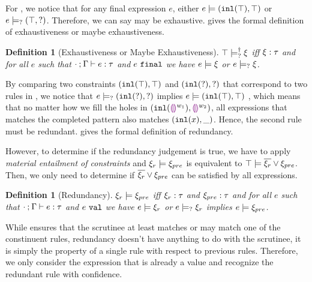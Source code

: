 \documentclass[acmsmall,screen,review,nonacm]{acmart}
\theoremstyle{slplain}
\numberwithin{thm}{section}
\newtheorem{defn}[thm]{Definition}
\begin{document}
For , we notice that for any final expression $e$, either 
$e \models (\mathtt{inl}(\top) , \top)$ or $e \models_{?} (\top , \mathtt{?})$.
Therefore, we can say  may be exhaustive.  gives the formal definition of exhaustiveness or maybe exhaustiveness.

\begin{defn}[Exhaustiveness or Maybe Exhaustiveness]
  \label{defn:exhaustiveness}
  $\top \models_{?}^{\dag} \xi$ iff $\xi : \tau$ and for all $e$ such that $\cdot \mathbin{;} \Gamma \vdash e : \tau$ and $e ~\mathtt{final}$ we have $e \models \xi$ or $e \models_{?} \xi$.
\end{defn}

By comparing two constraints $(\mathtt{inl}(\top) , \top)$ and $(\mathtt{inl}(\mathtt{?}) , \mathtt{?})$ that correspond to two rules in , we notice that
$e \models_{?} (\mathtt{inl}(\mathtt{?}) , \mathtt{?})$ implies $e \models (\mathtt{inl}(\top) , \top)$
, which means that no matter how we fill the holes in $(\mathtt{inl}(\textcolor{violet}{\llparenthesis}\textcolor{violet}{\rrparenthesis}^{w_1}) , \textcolor{violet}{\llparenthesis}\textcolor{violet}{\rrparenthesis}^{w_2})$, all expressions that matches the completed pattern also matches $(\mathtt{inl}(x) , \_)$. Hence, the second rule must be redundant.
 gives the formal definition of redundancy.

However, to determine if the redundancy judgement is true, we have to apply \emph{material entailment of constraints} and $\xi_r \models \xi_{pre}$ is equivalent to $\top \models \overline{\xi_r} \vee \xi_{pre}$. Then, we only need to determine if $\overline{\xi_r} \vee \xi_{pre}$ can be satisfied by all expressions.

\begin{defn}[Redundancy]
  \label{defn:redundancy}
  $\xi_r \models \xi_{pre}$ iff $\xi_r : \tau$ and $\xi_{pre} : \tau$ and for all $e$ such that $\cdot \mathbin{;} \Gamma \vdash e : \tau$ and $e ~\mathtt{val}$ we have $e \models \xi_r$ or $e \models_{?} \xi_r$ implies $e \models \xi_{pre}$.
\end{defn}

While  ensures that the scrutinee at least matches or may match one of the constinuent rules, redundancy doesn't have anything to do with the scrutinee, it is simply the property of a single rule with respect to previous rules. Therefore, we only consider the expression that is already a value and recognize the redundant rule with confidence.
\end{document}

